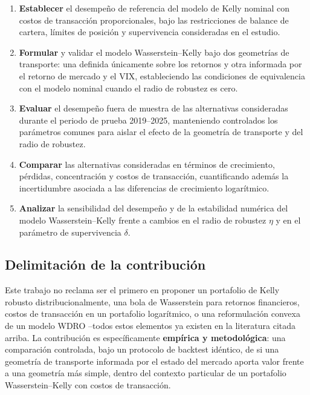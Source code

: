 \documentclass[11pt]{article}
\begin{document}
\begin{enumerate}
    \item \textbf{Establecer} el desempeño de referencia del modelo de Kelly nominal con costos de transacción proporcionales, bajo las restricciones de balance de cartera, límites de posición y supervivencia consideradas en el estudio.
\item \textbf{Formular} y validar el modelo Wasserstein–Kelly bajo dos geometrías de transporte: una definida únicamente sobre los retornos y otra informada por el retorno de mercado y el VIX, estableciendo las condiciones de equivalencia con el modelo nominal cuando el radio de robustez es cero.

\item \textbf{Evaluar} el desempeño fuera de muestra de las alternativas consideradas durante el periodo de prueba 2019–2025, manteniendo controlados los parámetros comunes para aislar el efecto de la geometría de transporte y del radio de robustez.

\item \textbf{Comparar} las alternativas consideradas en términos de crecimiento, pérdidas, concentración y costos de transacción, cuantificando además la incertidumbre asociada a las diferencias de crecimiento logarítmico.


\item \textbf{Analizar} la sensibilidad del desempeño y de la estabilidad numérica del modelo Wasserstein–Kelly frente a cambios en el radio de robustez $\eta$ y en el parámetro de supervivencia $\delta$.

\end{enumerate}

\subsection{Delimitación de la contribución}

Este trabajo no reclama ser el primero en proponer un portafolio de Kelly robusto
distribucionalmente, una bola de Wasserstein para retornos financieros, costos de
transacción en un portafolio logarítmico, o una reformulación convexa de un modelo WDRO
--todos estos elementos ya existen en la literatura citada arriba. La contribución es
específicamente \textbf{empírica y metodológica}: una comparación controlada, bajo un
protocolo de backtest idéntico, de si una geometría de transporte informada por el estado
del mercado aporta valor frente a una geometría más simple, dentro del contexto particular
de un portafolio Wasserstein--Kelly con costos de transacción.
\end{document}
